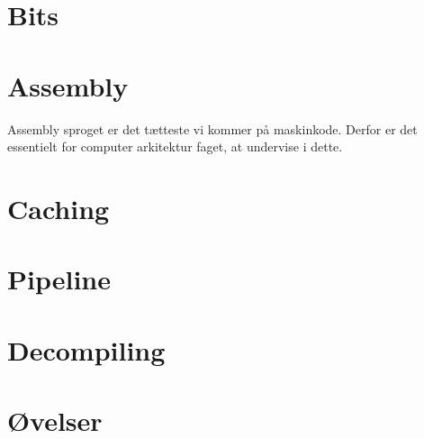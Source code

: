 

\chapter{Bits}
    
    
\chapter{Assembly}
Assembly sproget er det tætteste vi kommer på maskinkode.
Derfor er det essentielt for computer arkitektur faget, at undervise i dette.
    
\chapter{Caching}
    
\chapter{Pipeline}
    
\chapter{Decompiling}
    
\chapter{Øvelser}
    
